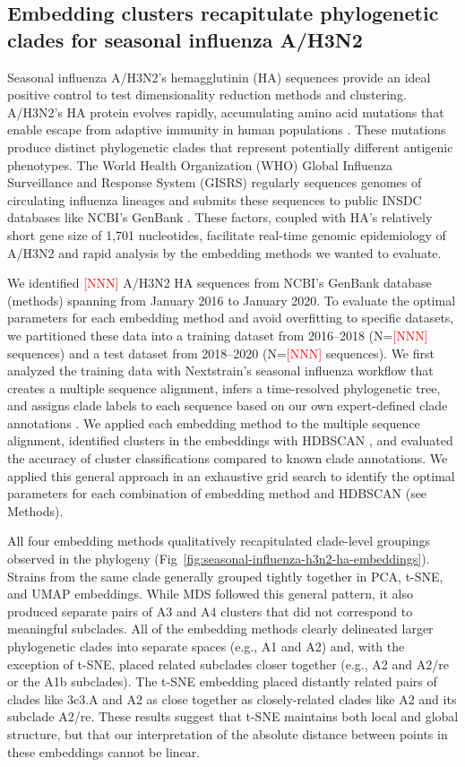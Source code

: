 \documentclass[10pt,letterpaper]{article}
\def\jhc#1{\textcolor{red}{[#1]}}
\begin{document}
\subsection*{Embedding clusters recapitulate phylogenetic clades for seasonal influenza A/H3N2}

Seasonal influenza A/H3N2's hemagglutinin (HA) sequences provide an ideal positive control to test dimensionality reduction methods and clustering.
A/H3N2's HA protein evolves rapidly, accumulating amino acid mutations that enable escape from adaptive immunity in human populations \cite{flu-review}.
These mutations produce distinct phylogenetic clades that represent potentially different antigenic phenotypes.
The World Health Organization (WHO) Global Influenza Surveillance and Response System (GISRS) regularly sequences genomes of circulating influenza lineages \cite{who-gisrs} and submits these sequences to public INSDC databases like NCBI's GenBank \cite{insdc}.
These factors, coupled with HA's relatively short gene size of 1,701 nucleotides, facilitate real-time genomic epidemiology of A/H3N2 \cite{nextflu,nextstrain} and rapid analysis by the embedding methods we wanted to evaluate.

We identified \jhc{NNN} A/H3N2 HA sequences from NCBI's GenBank database (methods) spanning from January 2016 to January 2020.
To evaluate the optimal parameters for each embedding method and avoid overfitting to specific datasets, we partitioned these data into a training dataset from 2016--2018 (N=\jhc{NNN} sequences) and a test dataset from 2018--2020 (N=\jhc{NNN} sequences).
We first analyzed the training data with Nextstrain's seasonal influenza workflow that creates a multiple sequence alignment, infers a time-resolved phylogenetic tree, and assigns clade labels to each sequence based on our own expert-defined clade annotations \cite{nextstrain,seasonal-flu,augur}.
We applied each embedding method to the multiple sequence alignment, identified clusters in the embeddings with HDBSCAN \cite{hdbscan}, and evaluated the accuracy of cluster classifications compared to known clade annotations.
We applied this general approach in an exhaustive grid search to identify the optimal parameters for each combination of embedding method and HDBSCAN (see Methods).

All four embedding methods qualitatively recapitulated clade-level groupings observed in the phylogeny (Fig~\ref{fig:seasonal-influenza-h3n2-ha-embeddings}).
Strains from the same clade generally grouped tightly together in PCA, t-SNE, and UMAP embeddings.
While MDS followed this general pattern, it also produced separate pairs of A3 and A4 clusters that did not correspond to meaningful subclades.
All of the embedding methods clearly delineated larger phylogenetic clades into separate spaces (e.g., A1 and A2) and, with the exception of t-SNE, placed related subclades closer together (e.g., A2 and A2/re or the A1b subclades).
The t-SNE embedding placed distantly related pairs of clades like 3c3.A and A2 as close together as closely-related clades like A2 and its subclade A2/re.
These results suggest that t-SNE maintains both local and global structure, but that our interpretation of the absolute distance between points in these embeddings cannot be linear.
\end{document}
